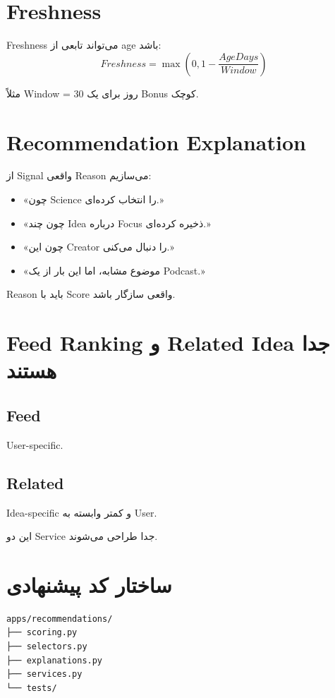 \section{Freshness}

Freshness می‌تواند تابعی از age باشد:
\[
Freshness = \max(0, 1 - \frac{AgeDays}{Window})
\]

مثلاً Window = 30 روز برای یک Bonus کوچک.

\section{Recommendation Explanation}

از Signal واقعی Reason می‌سازیم:
\begin{itemize}
  \item «چون Science را انتخاب کرده‌ای.»
  \item «چون چند Idea درباره Focus ذخیره کرده‌ای.»
  \item «چون این Creator را دنبال می‌کنی.»
  \item «موضوع مشابه، اما این بار از یک Podcast.»
\end{itemize}

Reason باید با Score واقعی سازگار باشد.

\section{Feed Ranking و Related Idea جدا هستند}

\subsection{Feed}

User-specific.

\subsection{Related}

Idea-specific و کمتر وابسته به User.

این دو Service جدا طراحی می‌شوند.

\section{ساختار کد پیشنهادی}

\begin{latin}
\begin{lstlisting}
apps/recommendations/
├── scoring.py
├── selectors.py
├── explanations.py
├── services.py
└── tests/
\end{lstlisting}
\end{latin}

